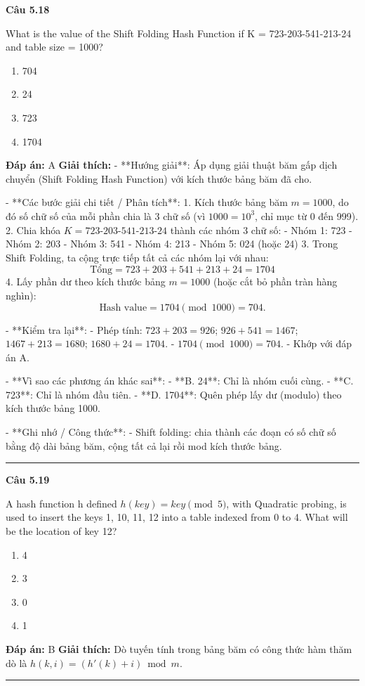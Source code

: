 \documentclass[11pt,a4paper]{article}
\newenvironment{question}[1]{%
  \par\vspace{1em}\noindent\textbf{\large Câu #1}\par\vspace{0.4em}
}{%
  \par\vspace{1em}\hrule\vspace{0.6em}
}
\newenvironment{choices}{%
  \begin{enumerate}[label=\textbf{\Alph*.},leftmargin=2.2em,itemsep=2pt,topsep=3pt]
}{%
  \end{enumerate}
}
\newcommand{\choice}{\item}
\begin{document}
\begin{question}{5.18}
What is the value of the Shift Folding Hash Function if K = 723-203-541-213-24 and table size = 1000?
\begin{choices}
\choice 704
\choice 24
\choice 723
\choice 1704
\end{choices}
\textbf{Đáp án:} A
\textbf{Giải thích:} - **Hướng giải**:
  Áp dụng giải thuật băm gấp dịch chuyển (Shift Folding Hash Function) với kích thước bảng băm đã cho.

- **Các bước giải chi tiết / Phân tích**:
  1. Kích thước bảng băm \(m = 1000\), do đó số chữ số của mỗi phần chia là 3 chữ số (vì \(1000 = 10^3\), chỉ mục từ 0 đến 999).
  2. Chia khóa \(K = 723\text{-}203\text{-}541\text{-}213\text{-}24\) thành các nhóm 3 chữ số:
     - Nhóm 1: 723
     - Nhóm 2: 203
     - Nhóm 3: 541
     - Nhóm 4: 213
     - Nhóm 5: 024 (hoặc 24)
  3. Trong Shift Folding, ta cộng trực tiếp tất cả các nhóm lại với nhau:
     \[ \text{Tổng} = 723 + 203 + 541 + 213 + 24 = 1704 \]
  4. Lấy phần dư theo kích thước bảng \(m = 1000\) (hoặc cắt bỏ phần tràn hàng nghìn):
     \[ \text{Hash value} = 1704 \pmod{1000} = 704. \]

- **Kiểm tra lại**:
  - Phép tính: \(723 + 203 = 926\); \(926 + 541 = 1467\); \(1467 + 213 = 1680\); \(1680 + 24 = 1704\).
  - \(1704 \pmod{1000} = 704\).
  - Khớp với đáp án A.

- **Vì sao các phương án khác sai**:
  - **B. 24**: Chỉ là nhóm cuối cùng.
  - **C. 723**: Chỉ là nhóm đầu tiên.
  - **D. 1704**: Quên phép lấy dư (modulo) theo kích thước bảng 1000.

- **Ghi nhớ / Công thức**:
  - Shift folding: chia thành các đoạn có số chữ số bằng độ dài bảng băm, cộng tất cả lại rồi mod kích thước bảng.
\end{question}

\begin{question}{5.19}
A hash function h defined \(h(key) = key \pmod{5}\), with Quadratic probing, is used to insert the keys 1, 10, 11, 12 into a table indexed from 0 to 4. What will be the location of key 12?
\begin{choices}
\choice 4
\choice 3
\choice 0
\choice 1
\end{choices}
\textbf{Đáp án:} B
\textbf{Giải thích:} Dò tuyến tính trong bảng băm có công thức hàm thăm dò là \(h(k, i) = (h'(k) + i) \bmod m\).
\end{question}
\end{document}
